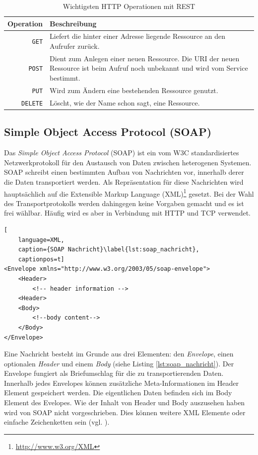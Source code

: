 \begin{table}[ht]
\centering
\caption{Wichtigsten HTTP Operationen mit REST} 
\begin{tabular}{r|p{12cm}}
    \textbf{Operation} & 
    \textbf{Beschreibung} \\ 
    \hline
    \texttt{GET} & 
    Liefert die hinter einer Adresse liegende Ressource an den Aufrufer zurück.\\
    
    \texttt{POST} & 
    Dient zum Anlegen einer neuen Ressource. Die URI der neuen Ressource ist beim Aufruf noch unbekannt und wird vom Service bestimmt. \\

    \texttt{PUT} & 
    Wird zum Ändern eine bestehenden Ressource genutzt. \\
    
    \texttt{DELETE} &
    Löscht, wie der Name schon sagt, eine Ressource.
\end{tabular}
\label{tbl:rest_oprations}
\end{table} 
     

\subsection{Simple Object Access Protocol (SOAP)} %
\label{sub:soap}

Das \emph{Simple Object Access Protocol} (SOAP) ist ein vom W3C standardisiertes Netzwerkprotokoll für den Austausch von Daten zwischen heterogenen Systemen. SOAP schreibt einen bestimmten Aufbau von Nachrichten vor, innerhalb derer die Daten transportiert werden. Als Repräsentation für diese Nachrichten wird hauptsächlich auf die Extensible Markup Language (XML)\footnote{\url{http://www.w3.org/XML}} gesetzt. Bei der Wahl des Transportprotokolls werden dahingegen keine Vorgaben gemacht und es ist frei wählbar. Häufig wird es aber in Verbindung mit HTTP und TCP verwendet. 

\begin{lstlisting}[
    language=XML,
    caption={SOAP Nachricht}\label{lst:soap_nachricht},
    captionpos=t]
<Envelope xmlns="http://www.w3.org/2003/05/soap-envelope">
    <Header>
        <!-- header information -->
    <Header> 
    <Body>
        <!--body content-->
    </Body>
</Envelope>
\end{lstlisting}

Eine Nachricht besteht im Grunde aus drei Elementen: den \emph{Envelope}, einen optionalen \emph{Header} und einem \emph{Body} (siehe Listing \ref{lst:soap_nachricht}). Der Envelope fungiert als Briefumschlag für die zu transportierenden Daten. Innerhalb jedes Envelopes können zusätzliche Meta-Informationen im Header Element gespeichert werden. Die eigentlichen Daten befinden sich im Body Element des Evelopes. Wie der Inhalt von Header und Body auszusehen haben wird von SOAP nicht vorgeschrieben. Dies können weitere XML Elemente oder einfache Zeichenketten sein (vgl. \cite{Mitra2007}). 

